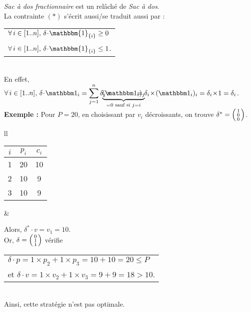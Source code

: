 \documentclass{article}
\newcommand{\elt}[1]{\textbf{#1}}
\newcommand{\dotp}{\! \cdot \!}
\newcommand{\x}{\! \times \!}
\newcommand{\nl}{\\[5mm]}
\newcommand{\1}{\bbm{1}}
\begin{document}
			\rem \textsf{\textit{Sac à dos fractionnaire}} est un relâché de \textsf{\textit{Sac à dos}}.
				\\[5mm]
			\rem La contrainte $(*)$ s'écrit aussi/se traduit aussi par : \hspace{-4.2mm}
				\begin{tabular}{l}
					\( \forall \, i \in [1..n], \, \delta \! \cdot \! \mathbbm{1}_{\{i\}} \geq 0 \) \\
					\( \forall \, i \in [1..n], \, \delta \! \cdot \! \mathbbm{1}_{\{i\}} \leq 1 \). \\
				\end{tabular}
				\\[-2mm]
			En effet, \( \forall \, i \in [1..n], \, \delta \dotp \1_{i} = \displaystyle \sum_{j=1}^{n} \delta_j \x \hspace{-5mm} \underbrace{(\1_i)_j}_{=0 \text{ sauf si } j = i} \hspace{-5mm} = \delta_i \x (\1_i)_i = \delta_i \x 1 = \delta_i \).
				\nl
			\elt{Exemple :} Pour $P = 20$, en choisissant par $v_i$ décroissants, on trouve \( \delta^* = \begin{psmallmatrix} 1 \\ 0 \\ 0 \end{psmallmatrix} \).
			\\[-3mm]
				\begin{tabular}[t]{ll}
					\begin{tabular}[t]{| c | c | c |}
						\hline
						$i$ & $p_i$ & $c_i$ \\ \hline
						1 & 20 & 10 \\ \hline
						2 & 10 & 9 \\ \hline
						3 & 10 & 9 \\ \hline
					\end{tabular}
					&
					\parbox[t]{120mm}{
						\vspace{1mm}
						Alors, $\delta^* \! \dotp v = v_1 = 10$. \\
						Or, \( \delta = \begin{psmallmatrix} 0 \\ 1 \\ 1 \end{psmallmatrix} \) vérifie
						\hspace{-8mm}
							\begin{tabular}[t]{l}
								\hspace{3.6mm} \( \delta \dotp p = 1 \x p_2 + 1 \x p_3 = 10 + 10 = 20 \leq P \) \\
								et \( \delta \dotp v = 1 \x v_2 + 1 \x v_3 = 9 + 9 = 18 > 10 \).
							\end{tabular} \\
						Ainsi, cette stratégie n'est pas optimale.
					}
				\end{tabular}
\end{document}

